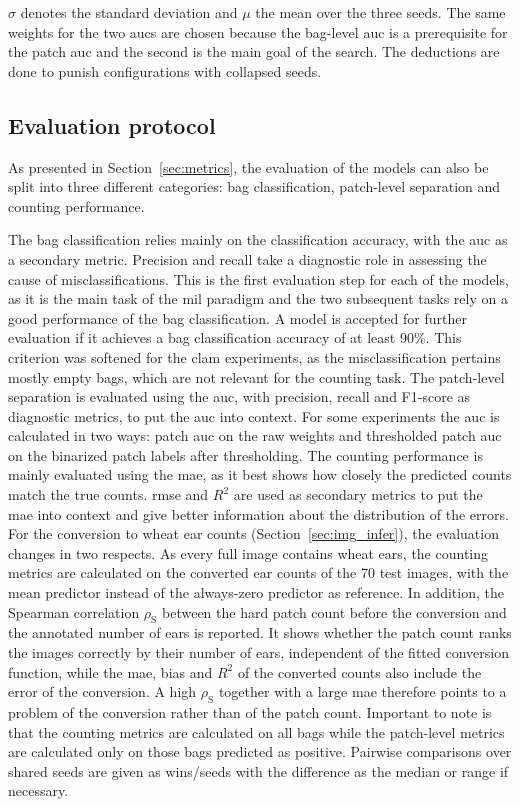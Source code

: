 \documentclass[12pt,parskip = half, DIV=classic,listof=totoc]{scrartcl}
\begin{document}
			$\sigma$ denotes the standard deviation and $\mu$ the mean over the three seeds. The same weights for the two \acp{auc} are chosen
			because the bag-level \ac{auc} is a prerequisite for the patch \ac{auc} and the second is the main goal of the search. The deductions
			are done to punish configurations with collapsed seeds.


		\subsection{Evaluation protocol}\label{sec:eval}

			As presented in Section~\ref{sec:metrics}, the evaluation of the models can also be split into three
			different categories: bag classification, patch-level separation and counting performance.
			
			The bag classification relies mainly on the classification accuracy, with the \ac{auc} as a secondary metric. Precision and recall take a diagnostic
			role in assessing the cause of misclassifications. This is the first evaluation step for 
			each of the models, as it is the main task of the \ac{mil} paradigm and the two subsequent tasks rely on a good performance of the bag classification.
			A model is accepted for further evaluation if it achieves a bag classification accuracy of at least 90\%.
			This criterion was softened for the \ac{clam} experiments, as the misclassification pertains mostly empty bags, which are not relevant for the counting task.
			The patch-level separation is evaluated using the \ac{auc}, with precision, recall and F1-score as diagnostic metrics, to put the \ac{auc} into context.
			For some experiments the \ac{auc} is calculated in two ways: patch \ac{auc} on the raw weights and thresholded patch \ac{auc} on the binarized patch labels after 
			thresholding. The counting performance is mainly evaluated using the \ac{mae}, as it best shows how closely the predicted counts match the true counts.
			\Ac{rmse} and $R^2$ are used as secondary metrics to put the \ac{mae} into context and give better information about the distribution of the errors.
			For the conversion to wheat ear counts (Section~\ref{sec:img_infer}), the evaluation changes in two 
			respects. As every full image contains wheat ears, the counting metrics are calculated on the converted 
			ear counts of the 70 test images, with the mean predictor instead of the always-zero predictor as reference. 
			In addition, the Spearman correlation $\rho_{\text{S}}$ between the hard patch count before the conversion 
			and the annotated number of ears is reported. It shows whether the patch count ranks the images correctly 
			by their number of ears, independent of the fitted conversion function, while the \ac{mae}, bias and $R^2$ 
			of the converted counts also include the error of the conversion. A high $\rho_{\text{S}}$ together with a 
			large \ac{mae} therefore points to a problem of the conversion rather than of the patch count.
			Important to note is that the counting metrics are calculated on all bags while the patch-level metrics are calculated only on those
			bags predicted as positive. Pairwise comparisons over shared seeds are given as wins/seeds with the difference as the median or range if necessary.
\end{document}
